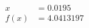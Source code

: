 \documentclass[preview]{standalone}
\begin{document}
\begin{align*}
x &= 0.0195\\f(x) &= 4.0413197
\end{align*}
\end{document}
